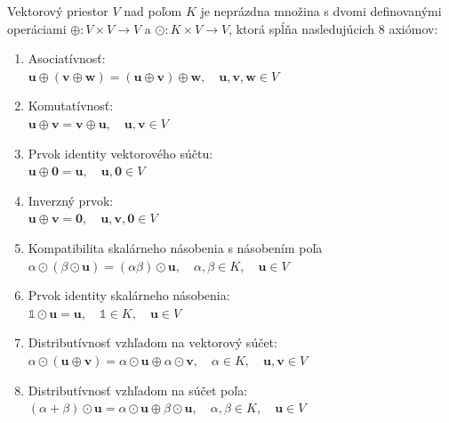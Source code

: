\documentclass[a4paper, 10pt, ]{article}
\begin{document}
\begin{definition}
    \label{VectorSpace.Definition:VectorSpace}
    Vektorový priestor $V$ nad poľom $K$ je neprázdna množina s dvomi definovanými operáciami $\oplus: V \times V \rightarrow V$  a $\odot: K \times V \rightarrow V$, ktorá spĺňa nasledujúcich 8 axiómov:
    \begin{enumerate}
        \TabPositions{1cm}
        \item Asociatívnosť: \\
        \tab\tab $\bm{u} \oplus (\bm{v} \oplus \bm{w}) = (\bm{u} \oplus \bm{v}) \oplus \bm{w}, \quad \bm{u}, \bm{v}, \bm{w} \in V$
        
        \item Komutatívnosť: \\
        \tab\tab $\bm{u} \oplus \bm{v} = \bm{v} \oplus \bm{u}, \quad \bm{u}, \bm{v} \in V$
        
        \item Prvok identity vektorového súčtu: \\
        \tab\tab $\bm{u} \oplus \bm{0} = \bm{u}, \quad \bm{u}, \bm{0} \in V$
        
        \item Inverzný prvok: \\
        \tab\tab $\bm{u} \oplus \bm{v} = \bm{0}, \quad \bm{u}, \bm{v}, \bm{0} \in V$
        
        \item Kompatibilita skalárneho násobenia s násobením poľa \\
        \tab\tab $\alpha \odot (\beta \odot \bm{u}) = (\alpha \beta) \odot \bm{u}, \quad \alpha, \beta \in K, \quad \bm{u} \in V$
        
        \item Prvok identity skalárneho násobenia: \\
        \tab\tab $\mathbb{1} \odot \bm{u} = \bm{u}, \quad \mathbb{1} \in K, \quad \bm{u} \in V$
        
        \item Distributívnosť vzhľadom na vektorový súčet: \\
        \tab\tab $\alpha \odot (\bm{u} \oplus \bm{v}) = \alpha \odot \bm{u} \oplus \alpha \odot \bm{v}, \quad \alpha \in K, \quad \bm{u}, \bm{v} \in V$
        
        \item Distributívnosť vzhľadom na súčet poľa: \\
        \tab\tab $(\alpha + \beta) \odot \bm{u} = \alpha \odot \bm{u} \oplus \beta \odot \bm{u}, \quad \alpha, \beta \in K, \quad \bm{u} \in V$
    \end{enumerate}
\end{definition}
\end{document}
